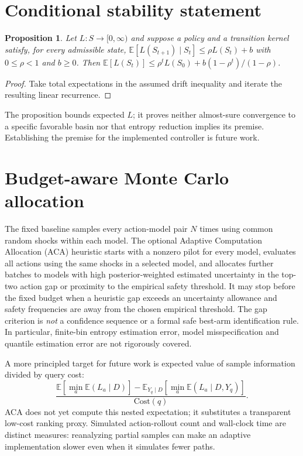 \documentclass[11pt]{article}
\newtheorem{proposition}{Proposition}
\begin{document}
\section{Conditional stability statement}
\begin{proposition}
Let $L:S\to[0,\infty)$ and suppose a policy and a transition kernel satisfy, for every admissible state, $\mathbb E[L(S_{t+1})\mid S_t]\le\rho L(S_t)+b$ with $0\le\rho<1$ and $b\ge0$. Then $\mathbb E[L(S_t)]\le \rho^tL(S_0)+b(1-\rho^t)/(1-\rho)$.
\end{proposition}
\begin{proof}
Take total expectations in the assumed drift inequality and iterate the resulting linear recurrence.
\end{proof}
The proposition bounds expected $L$; it proves neither almost-sure convergence to a specific favorable basin nor that entropy reduction implies its premise. Establishing the premise for the implemented controller is future work.
\section{Budget-aware Monte Carlo allocation}
The fixed baseline samples every action-model pair $N$ times using common random shocks within each model. The optional Adaptive Computation Allocation (ACA) heuristic starts with a nonzero pilot for every model, evaluates all actions using the same shocks in a selected model, and allocates further batches to models with high posterior-weighted estimated uncertainty in the top-two action gap or proximity to the empirical safety threshold. It may stop before the fixed budget when a heuristic gap exceeds an uncertainty allowance and safety frequencies are away from the chosen empirical threshold. The gap criterion is \emph{not} a confidence sequence or a formal safe best-arm identification rule. In particular, finite-bin entropy estimation error, model misspecification and quantile estimation error are not rigorously covered.

A more principled target for future work is expected value of sample information divided by query cost:
\begin{equation}
\frac{\mathbb E[\min_a \mathbb E(L_a\mid D)]-
\mathbb E_{Y_q\mid D}[\min_a\mathbb E(L_a\mid D,Y_q)]}
{\mathrm{Cost}(q)}.
\end{equation}
ACA does not yet compute this nested expectation; it substitutes a transparent low-cost ranking proxy. Simulated action-rollout count and wall-clock time are distinct measures: reanalyzing partial samples can make an adaptive implementation slower even when it simulates fewer paths.
\end{document}
